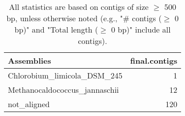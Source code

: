 \documentclass[12pt,a4paper]{article}
\begin{document}
\begin{table}[ht]
\begin{center}
\caption{All statistics are based on contigs of size $\geq$ 500 bp, unless otherwise noted (e.g., "\# contigs ($\geq$ 0 bp)" and "Total length ($\geq$ 0 bp)" include all contigs).}
\begin{tabular}{|l*{1}{|r}|}
\hline
Assemblies & final.contigs \\ \hline
Chlorobium\_limicola\_DSM\_245 & 1 \\ \hline
Methanocaldococcus\_jannaschii & 12 \\ \hline
not\_aligned & 120 \\ \hline
\end{tabular}
\end{center}
\end{table}
\end{document}
